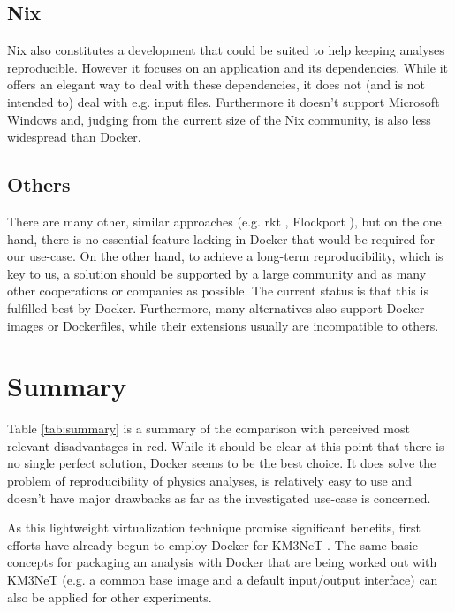 \documentclass[a4paper, twoside, 11pt]{article}
\begin{document}
\subsection{Nix}
Nix \cite{nix:about} also constitutes a development that could be suited to help keeping analyses reproducible. 
However it focuses on an application and its dependencies. 
While it offers an elegant way to deal with these dependencies, it does not (and is not intended to) deal with e.g. input files. 
Furthermore it doesn't support Microsoft Windows and, 
judging from the current size of the Nix community, is also less widespread than Docker. 


\subsection{Others}
There are many other, similar approaches 
(e.g. rkt \cite{rkt:about}, Flockport \cite{flockport:about}), 
but on the one hand, there is no essential feature lacking in Docker that would be required 
for our use-case. 
On the other hand, to achieve a long-term reproducibility, which is key to us, 
a solution should be supported by a large community and as many other cooperations or companies as possible. 
The current status is that this is fulfilled best by Docker. 
Furthermore, many alternatives also support Docker images or Dockerfiles, while their extensions usually are incompatible to others. 


\section{Summary}

Table \ref{tab:summary} is a summary of the comparison with perceived most relevant disadvantages in red.  
While it should be clear at this point that there is no single perfect solution, 
Docker seems to be the best choice. It does solve the problem of reproducibility of physics analyses, 
is relatively easy to use \cite{km3net:howdocker} 
and doesn't have major drawbacks as far as the investigated use-case is concerned. 

As this lightweight virtualization technique promise significant benefits, 
first efforts have already begun to employ Docker for KM3NeT \cite{github:dockerprojects}. 
The same basic concepts for packaging an analysis with Docker that are being worked out with KM3NeT 
(e.g. a common base image and a default input/output interface) can also be applied for other experiments.
\end{document}
